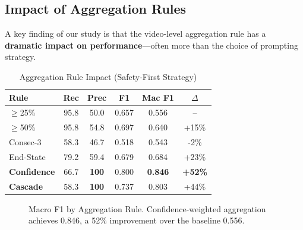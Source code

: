 \documentclass[conference]{IEEEtran}
\begin{document}
\subsection{Impact of Aggregation Rules}

A key finding of our study is that the video-level aggregation rule has a \textbf{dramatic impact on performance}—often more than the choice of prompting strategy.

\begin{table}[H]
\centering
\caption{Aggregation Rule Impact (Safety-First Strategy)}
\label{tab:aggregation}
\begin{tabular}{lccccc}
\toprule
\textbf{Rule} & \textbf{Rec} & \textbf{Prec} & \textbf{F1} & \textbf{Mac F1} & $\Delta$ \\
\midrule
$\geq$25\% & 95.8 & 50.0 & 0.657 & 0.556 & -- \\
$\geq$50\% & 95.8 & 54.8 & 0.697 & 0.640 & +15\% \\
Consec-3 & 58.3 & 46.7 & 0.518 & 0.543 & -2\% \\
End-State & 79.2 & 59.4 & 0.679 & 0.684 & +23\% \\
\textbf{Confidence} & 66.7 & \textbf{100} & 0.800 & \textbf{0.846} & \textbf{+52\%} \\
\textbf{Cascade} & 58.3 & \textbf{100} & 0.737 & 0.803 & +44\% \\
\bottomrule
\end{tabular}
\end{table}

\begin{figure}[H]
\centering
{}
\caption{Macro F1 by Aggregation Rule. Confidence-weighted aggregation achieves 0.846, a 52\% improvement over the baseline 0.556.}
\label{fig:aggregation_impact}
\end{figure}
\end{document}
